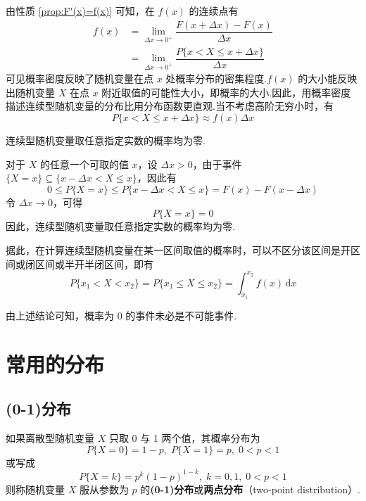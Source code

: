 由性质 \ref*{prop:F'(x)=f(x)} 可知，在 $f(x)$ 的连续点有
$$
\begin{aligned}
    f(x) &= \lim_{\Delta x \to 0^+} \dfrac{F(x + \Delta x)-F(x)}{\Delta x}\\
    &= \lim_{\Delta x \to 0^+} \dfrac{P\{x < X \leqslant x + \Delta x\}}{\Delta x}
\end{aligned}
$$
可见概率密度反映了随机变量在点 $x$ 处概率分布的密集程度.$f(x)$ 的大小能反映出随机变量 $X$ 在点 $x$ 附近取值的可能性大小，即概率的大小.因此，用概率密度描述连续型随机变量的分布比用分布函数更直观.当不考虑高阶无穷小时，有
$$
P\{x < X \leqslant x + \Delta x\} \approx f(x) \Delta x
$$

\begin{conclusion}
    连续型随机变量取任意指定实数的概率均为零.
\end{conclusion}

\begin{myproof}
    对于 $X$ 的任意一个可取的值 $x$，设 $\Delta x > 0$，由于事件 $\{X=x\} \subseteq \{x - \Delta x < X \leqslant x\}$，因此有
    $$
    0 \leqslant P\{X=x\} \leqslant P\{x - \Delta x < X \leqslant x\} = F(x)-F(x-\Delta x)
    $$
    令 $\Delta x \to 0$，可得
    $$
    P\{X=x\}=0
    $$
    因此，连续型随机变量取任意指定实数的概率均为零.
\end{myproof}


据此，在计算连续型随机变量在某一区间取值的概率时，可以不区分该区间是开区间或闭区间或半开半闭区间，即有
$$
P\{x_1 < X < x_2\} = P\{x_1 \leqslant X \leqslant x_2\} = \int_{x_1}^{x_2} f(x)\,\text{d}x
$$

由上述结论可知，概率为 0 的事件未必是不可能事件.

\section{常用的分布}

\subsection{(0-1)分布}

\begin{definition}
    如果离散型随机变量 $X$ 只取 0 与 1 两个值，其概率分布为
    $$
    P\{X=0\}=1-p, \; P\{X=1\}=p, \; 0<p<1
    $$
    或写成
    $$
    P\{X=k\}=p^k (1-p)^{1-k}, \; k=0,1, \; 0<p<1
    $$
    则称随机变量 $X$ 服从参数为 $p$ 的\textbf{(0-1)分布}或\textbf{两点分布}（two-point distribution）.
\end{definition}

